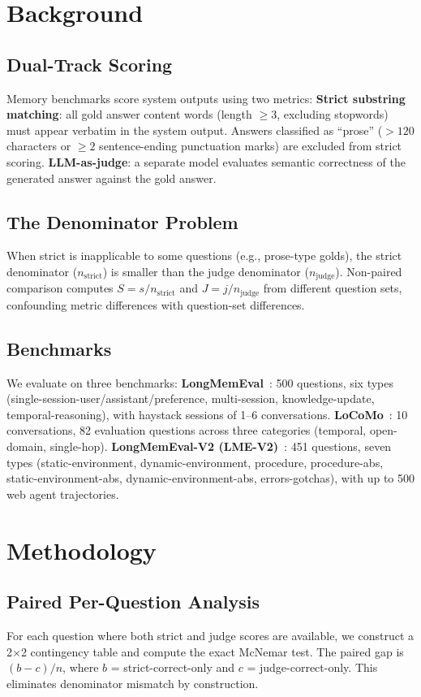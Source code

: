 \documentclass[10pt]{article}
\begin{document}
\section{Background}
\subsection{Dual-Track Scoring}
Memory benchmarks score system outputs using two metrics:
\textbf{Strict substring matching}: all gold answer content words (length $\geq 3$, excluding stopwords) must appear verbatim in the system output. Answers classified as ``prose'' ($>120$ characters or $\geq 2$ sentence-ending punctuation marks) are excluded from strict scoring.
\textbf{LLM-as-judge}: a separate model evaluates semantic correctness of the generated answer against the gold answer.

\subsection{The Denominator Problem}
When strict is inapplicable to some questions (e.g., prose-type golds), the strict denominator ($n_{\text{strict}}$) is smaller than the judge denominator ($n_{\text{judge}}$). Non-paired comparison computes $S = s/n_{\text{strict}}$ and $J = j/n_{\text{judge}}$ from different question sets, confounding metric differences with question-set differences.

\subsection{Benchmarks}
We evaluate on three benchmarks:
\textbf{LongMemEval}~\citep{wu2024longmemeval}: 500 questions, six types (single-session-user/assistant/preference, multi-session, knowledge-update, temporal-reasoning), with haystack sessions of 1--6 conversations.
\textbf{LoCoMo}~\citep{locomo2024}: 10 conversations, 82 evaluation questions across three categories (temporal, open-domain, single-hop).
\textbf{LongMemEval-V2 (LME-V2)}~\citep{longmemevalv2}: 451 questions, seven types (static-environment, dynamic-environment, procedure, procedure-abs, static-environment-abs, dynamic-environment-abs, errors-gotchas), with up to 500 web agent trajectories.

\section{Methodology}
\subsection{Paired Per-Question Analysis}
For each question where both strict and judge scores are available, we construct a 2$\times$2 contingency table and compute the exact McNemar test. The paired gap is $(b - c)/n$, where $b$ = strict-correct-only and $c$ = judge-correct-only. This eliminates denominator mismatch by construction.
\end{document}

